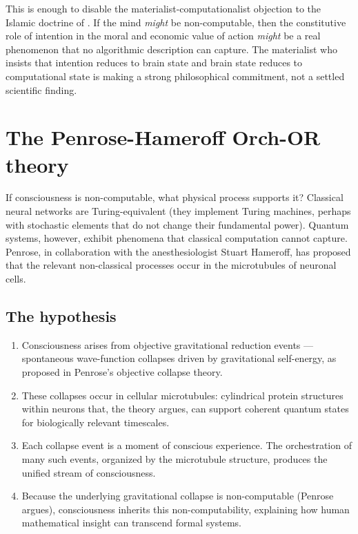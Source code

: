 This is enough to disable the materialist-computationalist objection
to the Islamic doctrine of . If the mind \emph{might}
be non-computable, then the constitutive role of intention in the
moral and economic value of action \emph{might} be a real
phenomenon that no algorithmic description can capture. The
materialist who insists that intention reduces to brain state and
brain state reduces to computational state is making a strong
philosophical commitment, not a settled scientific finding.

\section{The Penrose-Hameroff Orch-OR theory}
\label{sec:orch-or}

If consciousness is non-computable, what physical process supports
it? Classical neural networks are Turing-equivalent (they implement
Turing machines, perhaps with stochastic elements that do not change
their fundamental power). Quantum systems, however, exhibit
phenomena that classical computation cannot capture. Penrose, in
collaboration with the anesthesiologist Stuart Hameroff, has
proposed that the relevant non-classical processes occur in the
microtubules of neuronal cells.

\subsection{The hypothesis}

\begin{conceptbox}
\label{conc:orch-or}
\begin{enumerate}[leftmargin=1.5em]
    \item Consciousness arises from objective gravitational
    reduction events --- spontaneous wave-function collapses driven
    by gravitational self-energy, as proposed in Penrose's objective
    collapse theory.
    \item These collapses occur in cellular microtubules:
    cylindrical protein structures within neurons that, the theory
    argues, can support coherent quantum states for biologically
    relevant timescales.
    \item Each collapse event is a moment of conscious experience.
    The orchestration of many such events, organized by the
    microtubule structure, produces the unified stream of
    consciousness.
    \item Because the underlying gravitational collapse is non-computable
    (Penrose argues), consciousness inherits this non-computability,
    explaining how human mathematical insight can transcend formal
    systems.
\end{enumerate}
\end{conceptbox}

